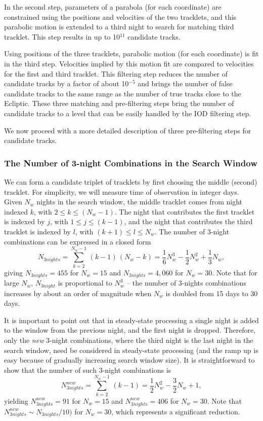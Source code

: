 In the second step, parameters of a parabola (for each coordinate) are constrained using the 
positions and velocities of the two tracklets, and this parabolic motion is extended to a third
night to search for matching third tracklet. This step results in up to 10$^{11}$ candidate
tracks. 

Using positions of the three tracklets, parabolic motion (for each coordinate) is fit 
in the third step. Velocities implied by this motion fit are compared to velocities for
the first and third tracklet. This filtering step reduces the number of candidate tracks
by a factor of about 10$^{-5}$ and brings the number of false candidate tracks to 
the same range as the number of true tracks close to the Ecliptic. These three matching
and pre-filtering steps bring the number of candidate tracks to a level that 
can be easily handled by the IOD filtering step.  

We now proceed with a more detailed description of  three pre-filtering steps
for candidate tracks. 

\subsubsection{The Number of 3-night Combinations in the Search Window} 

We can form a candidate triplet of tracklets by first choosing the middle (second) tracklet.
For simplicity, we will measure time of observation in integer days. Given $N_w$ nights
in the search window, the middle tracklet comes from night indexed $k$, with 
$2 \le k \le (N_w-1)$. The night that contributes the first tracklet is indexed by $j$, 
with $1 \le j \le (k-1)$, and the night that contributes the third tracklet is indexed by $l$, 
with $(k+1) \le l \le N_w$. The number of 3-night combinations can be expressed in a closed
form
\begin{equation}
\label{eq:N3n}
  N_{3nights} = \sum_{k=2}^{N_w-1} \, (k-1)\, (N_w-k) =\frac{1}{6}N_w^3 - \frac{1}{2}N_w^2 + \frac{1}{3}N_w,
\end{equation}
giving $N_{3nights} = 455$ for $N_w=15$ and $N_{3nights} = 4,060$ for $N_w=30$.  Note
that for large $N_w$, $N_{3night}$ is proportional to $N_w^3$ -- the number of 3-nights
combinations increases by about an order of magnitude when $N_w$ is doubled from
15 days to 30 days. 

It is important to point out that in steady-state processing a single night is added to the 
window from the previous night, and the first night is dropped. Therefore, only the {\it new} 
3-night combinations, where the third night is the last night in the search window, need 
be considered in steady-state processing (and the ramp up is easy because of gradually
increasing search window size). It is straightforward to show that the number of such 
3-night combinations is
\begin{equation}
\label{eq:N3n}
  N_{3nights}^{new} = \sum_{k=2}^{N_w-1} \, (k-1) =\frac{1}{2}N_w^2 - \frac{3}{2}N_w + 1,
\end{equation}
yielding $N_{3nights}^{new} = 91$ for $N_w=15$ and $N_{3nights}^{new} = 406$ for $N_w=30$.
Note that $N_{3nights}^{new} \sim N_{3nights} / 10)$ for $N_w=30$, which represents
a significant reduction. 


